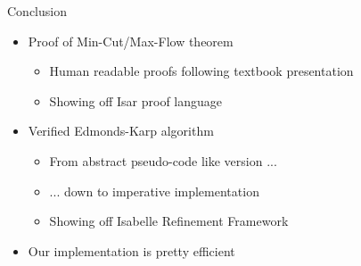 \documentclass[fleqn]{beamer}
\begin{document}
\begin{frame}{Conclusion}
  \begin{itemize}
   \item Proof of Min-Cut/Max-Flow theorem
    \begin{itemize}
     \item Human readable proofs following textbook presentation
     \item Showing off Isar proof language
    \end{itemize}
   \item Verified Edmonds-Karp algorithm
    \begin{itemize}
     \item From abstract pseudo-code like version ...
     \item ... down to imperative implementation
     \item Showing off Isabelle Refinement Framework
    \end{itemize}
   \item Our implementation is pretty efficient
    
    
  \end{itemize}
\end{frame}
\end{document}
